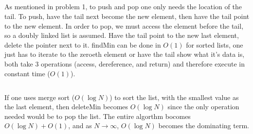 \documentclass[journal]{IEEEtran}
\begin{document}
\subsection{}
As mentioned in problem 1, to push and pop one only needs the location of the tail. To push, have the tail next 
become the new element, then have the tail point to the new element. In order to pop, we must access the element 
before the tail, so a doubly linked list is assumed. Have the tail point to the new last element, delete the pointer
next to it. findMin can be done in $O(1)$ for sorted lists, one just has to iterate to the zeroeth element or 
have the tail show what it's data is, both take 3 operations (access, dereference, and return) and therefore
execute in constant time ($O(1)$).

\subsection{}
If one uses merge sort ($O(\log N)$) to sort the list, with the smallest value as the last element, then deleteMin
becomes $O(\log N)$ since the only operation needed would be to pop the list. The entire algorthm bocomes 
$O(\log N) + O(1)$, and as $N \rightarrow \infty$, $O(\log N)$ becomes the dominating term.
\end{document}
